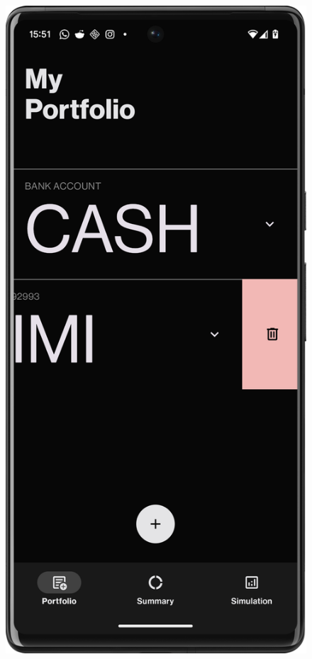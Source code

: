\documentclass{article}
\begin{document}
\begin{figure}[H]
\begin{minipage}{0.24\textwidth}
        \label{fig:spotify_swipe}
    \end{minipage}
    \hfill
    \begin{minipage}{0.24\textwidth}
        \centering
        \includegraphics[width=\textwidth]{foto/swipe_interaction}
        \label{fig:swipe_delete}
    \end{minipage}
\end{figure}
\end{document}
